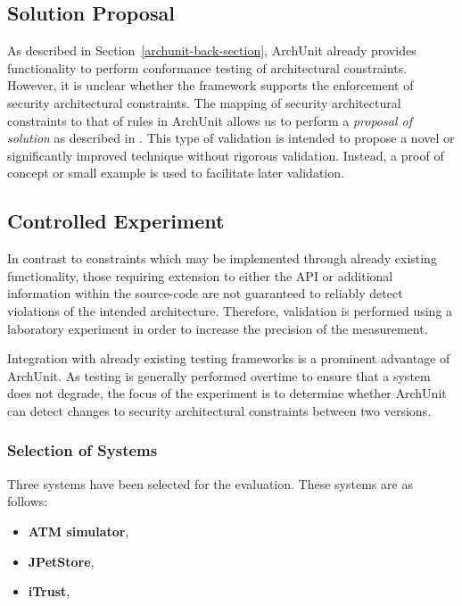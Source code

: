 \subsection{Solution Proposal}

As described in Section~\ref{archunit-back-section}, ArchUnit already provides functionality to perform conformance testing of architectural constraints. However, it is unclear whether the framework supports the enforcement of security architectural constraints. The mapping of security architectural constraints to that of rules in ArchUnit allows us to perform a \textit{proposal of solution} as described in \cite{wieringa_requirements_2006}. This type of validation is intended to propose a novel or significantly improved technique without rigorous validation. Instead, a proof of concept or small example is used to facilitate later validation. 

\subsection{Controlled Experiment} \label{sec-controlled-experiment}
In contrast to constraints which may be implemented through already existing functionality, those requiring extension to either the API or additional information within the source-code are not guaranteed to reliably detect violations of the intended architecture. Therefore, validation is performed using a laboratory experiment \cite{stol_abc_2018} in order to increase the precision of the measurement. 

Integration with already existing testing frameworks is a prominent advantage of ArchUnit. As testing is generally performed overtime to ensure that a system does not degrade, the focus of the experiment is to determine whether ArchUnit can detect changes to security architectural constraints between two versions. 

\subsubsection{Selection of Systems} \label{sct:selected-systems}
Three systems have been selected for the evaluation. These systems are as follows:

\begin{itemize}
    \item \textbf{ATM simulator}, 
    \item \textbf{JPetStore}, 
    \item \textbf{iTrust}, 
\end{itemize}

